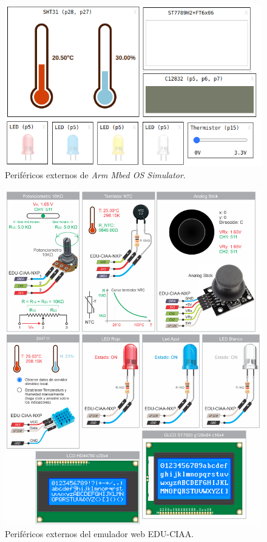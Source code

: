 \begin{figure}[ht]
	\centering
	\includegraphics[scale=.85]{./Figures/perifericosMBED.png}
	\caption{Periféricos externos de \textit{Arm Mbed OS Simulator}.}
	\label{fig:perifericosMbed}
\end{figure}

\begin{figure}[p]
	\centering
	\includegraphics[scale=.58]{./Figures/perifericosCIAA.png}
	\caption{Periféricos externos del emulador web EDU-CIAA.}
	\label{fig:perifericosCIAA}
\end{figure}

